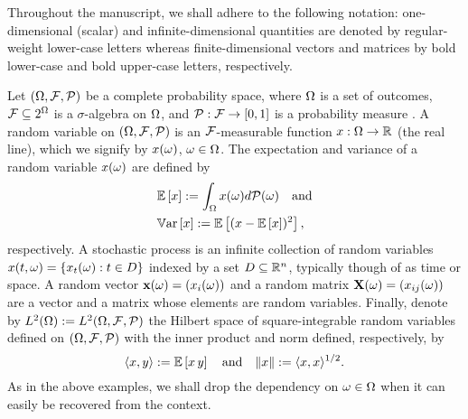 Throughout the manuscript, we shall adhere to the following notation: one-dimensional (scalar) and infinite-dimensional quantities are denoted by regular-weight lower-case letters whereas finite-dimensional vectors and matrices by bold lower-case and bold upper-case letters, respectively.

Let $(\Omega, \mathcal{F}, \mathcal{P})$ be a complete probability space, where $\Omega$ is a set of outcomes, $\mathcal{F} \subseteq 2^\Omega$ is a $\sigma$-algebra on $\Omega$, and $\mathcal{P}: \mathcal{F} \to [0, 1]$ is a probability measure \cite{maitre2010}.
A random variable on $(\Omega, \mathcal{F}, \mathcal{P})$ is an $\mathcal{F}$-measurable function $x: \Omega \to \mathbb{R}$ (the real line), which we signify by $x(\omega)$, $\omega \in \Omega$.
The expectation and variance of a random variable $x(\omega)$ are defined by
\begin{align*}
  & \mathbb{E}\left[ x \right] := \int_\Omega x(\omega) d \mathcal{P}(\omega) \hspace{1em} \text{and} \\
  & \mathbb{V}\text{ar}\left[ x \right] := \mathbb{E}\left[ (x - \mathbb{E}\left[ x \right])^2 \right],
\end{align*}
respectively.
A stochastic process is an infinite collection of random variables $x(t, \omega) = \{ x_t(\omega): t \in D \}$ indexed by a set $D \subseteq \mathbb{R}^n$, typically though of as time or space.
A random vector $\mathbf{x}(\omega) = (x_i(\omega))$ and a random matrix $\mathbf{X}(\omega) = (x_{ij}(\omega))$ are a vector and a matrix whose elements are random variables.
Finally, denote by $L^{2}(\Omega) := L^{2}(\Omega, \mathcal{F}, \mathcal{P})$ the Hilbert space of square-integrable random variables defined on $(\Omega, \mathcal{F}, \mathcal{P})$ with the inner product and norm defined, respectively, by
\begin{equation*}
  \langle x, y \rangle := \mathbb{E}\left[ x \, y \right] \hspace{1em} \text{and} \hspace{1em} \| x \| := \langle x, x \rangle^{1/2}.
\end{equation*}
As in the above examples, we shall drop the dependency on $\omega \in \Omega$ when it can easily be recovered from the context.

